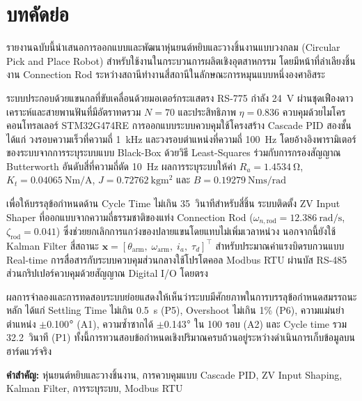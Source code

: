 
\chapter*{บทคัดย่อ}

รายงานฉบับนี้นำเสนอการออกแบบและพัฒนาหุ่นยนต์หยิบและวางชิ้นงานแบบวงกลม (Circular Pick and Place Robot)
สำหรับใช้งานในกระบวนการผลิตเชิงอุตสาหกรรม โดยมีหน้าที่ลำเลียงชิ้นงาน Connection Rod
ระหว่างสถานีทำงานสี่สถานีในลักษณะการหมุนแบบหนึ่งองศาอิสระ

ระบบประกอบด้วยแขนกลที่ขับเคลื่อนด้วยมอเตอร์กระแสตรง RS-775 กำลัง 24~V
ผ่านชุดเฟืองดาวเคราะห์และสายพานฟันที่มีอัตราทดรวม $N = 70$ และประสิทธิภาพ $\eta = 0.836$
ควบคุมด้วยไมโครคอนโทรลเลอร์ STM32G474RE
การออกแบบระบบควบคุมใช้โครงสร้าง Cascade PID สองชั้น ได้แก่
วงรอบความเร็วที่ความถี่ 1~kHz และวงรอบตำแหน่งที่ความถี่ 100~Hz
โดยอ้างอิงพารามิเตอร์ของระบบจากการระบุระบบแบบ Black-Box
ด้วยวิธี Least-Squares ร่วมกับการกรองสัญญาณ Butterworth อันดับสี่ที่ความถี่ตัด 10~Hz
ผลการระบุระบบให้ค่า $R_a = \SI{1.4534}{\ohm}$, $K_t = \SI{0.04065}{\newton\metre\per\ampere}$,
$J = \SI{0.72762}{\kilogram\metre\squared}$ และ $B = \SI{0.19279}{\newton\metre\second\per\radian}$

เพื่อให้บรรลุข้อกำหนดด้าน Cycle Time ไม่เกิน 35~วินาทีสำหรับสี่ชิ้น
ระบบติดตั้ง ZV Input Shaper ที่ออกแบบจากความถี่ธรรมชาติของแท่ง Connection Rod
($\omega_{n,\mathrm{rod}} = \SI{12.386}{\radian\per\second}$, $\zeta_\mathrm{rod} = 0.041$)
ซึ่งช่วยยกเลิกการแกว่งของปลายแขนโดยแทบไม่เพิ่มเวลาหน่วง
นอกจากนี้ยังใช้ Kalman Filter สี่สถานะ
$\mathbf{x} = [\theta_\mathrm{arm},\; \omega_\mathrm{arm},\; i_a,\; \tau_d]^\top$
สำหรับประมาณค่าแรงบิดรบกวนแบบ Real-time
การสื่อสารกับระบบควบคุมส่วนกลางใช้โปรโตคอล Modbus RTU ผ่านบัส RS-485
ส่วนกริปเปอร์ควบคุมด้วยสัญญาณ Digital I/O โดยตรง

ผลการจำลองและการทดสอบระบบย่อยแสดงให้เห็นว่าระบบมีศักยภาพในการบรรลุข้อกำหนดสมรรถนะหลัก
ได้แก่ Settling Time ไม่เกิน 0.5~s (P5), Overshoot ไม่เกิน 1\% (P6),
ความแม่นยำตำแหน่ง $\pm$0.100$\degree$ (A1),
ความซ้ำซากได้ $\pm$0.143$\degree$ ใน 100 รอบ (A2)
และ Cycle time รวม 32.2~วินาที (P1)
ทั้งนี้การทวนสอบข้อกำหนดเชิงปริมาณครบถ้วนอยู่ระหว่างดำเนินการเก็บข้อมูลบนฮาร์ดแวร์จริง

\vspace{1.2cm}
\noindent\textbf{คำสำคัญ:}
หุ่นยนต์หยิบและวางชิ้นงาน,
การควบคุมแบบ Cascade PID,
ZV Input Shaping,
Kalman Filter,
การระบุระบบ,
Modbus RTU

